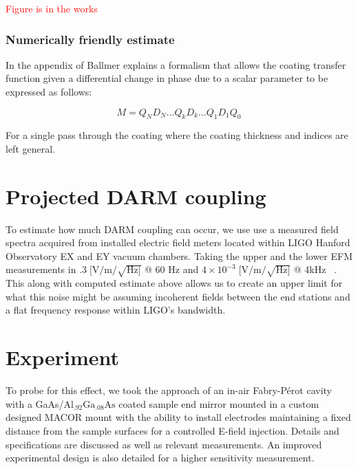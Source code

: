 
\textcolor{red}{Figure is in the works}

\subsubsection{Numerically friendly estimate}

In the appendix of \cite{ballmer2015} Ballmer explains a formalism that allows the coating transfer function given a differential change in phase due to a scalar parameter to be expressed as follows:

\begin{equation}
M = Q_N D_N ...Q_kD_k...Q_1D_1Q_0
\end{equation}

For a single pass through the coating where the coating thickness and indices are left general.


\section{Projected DARM coupling}
To estimate how much DARM coupling can occur, we use use a measured field spectra acquired from installed electric field meters located within LIGO Hanford Observatory EX and EY vacuum chambers. Taking the upper and the lower EFM measurements in $.3\; [\mathrm{V}/\mathrm{m}/\sqrt{\mathrm{Hz}]}$ @ 60 Hz and $4\times10^{-3}\; [\mathrm{V}/\mathrm{m}/\sqrt{\mathrm{Hz}]}$ @ 4kHz ~\cite{efm_log}.
This along with computed estimate above allows us to create an upper limit for what this noise might be assuming incoherent fields between the end stations and a flat frequency response within LIGO's bandwidth.

\section{Experiment}
To probe for this effect, we took the approach of an in-air Fabry-P\'{e}rot cavity with a GaAs/$\mathrm{Al_{.92}Ga_{.08}As}$ coated sample end mirror mounted in a custom designed MACOR mount with the ability to install electrodes maintaining a fixed distance from the sample surfaces for a controlled E-field injection. Details and specifications are discussed as well as relevant measurements. An improved experimental design is also detailed for a higher sensitivity measurement.

